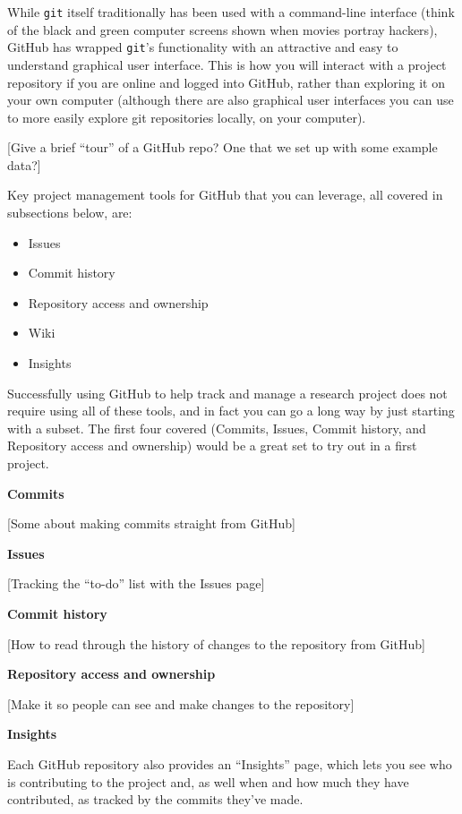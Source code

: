\documentclass[]{tufte-book}
\providecommand{\tightlist}{%
  \setlength{\itemsep}{0pt}\setlength{\parskip}{0pt}}
\begin{document}
While \texttt{git} itself traditionally has been used with a command-line interface
(think of the black and green computer screens shown when movies portray hackers),
GitHub has wrapped \texttt{git}'s functionality with an attractive and easy to
understand graphical user interface. This is how you will interact with a project
repository if you are online and logged into GitHub, rather than exploring it
on your own computer (although there are also graphical user interfaces you can
use to more easily explore git repositories locally, on your computer).

{[}Give a brief ``tour'' of a GitHub repo? One that we set up with some example data?{]}

Key project management tools for GitHub that you can leverage, all covered in
subsections below, are:

\begin{itemize}
\tightlist
\item
  Issues
\item
  Commit history
\item
  Repository access and ownership
\item
  Wiki
\item
  Insights
\end{itemize}

Successfully using GitHub to help track and manage a research project does not
require using all of these tools, and in fact you can go a long way by just starting
with a subset. The first four covered (Commits, Issues, Commit history, and Repository access
and ownership) would be a great set to try out in a first project.

\textbf{Commits}

{[}Some about making commits straight from GitHub{]}

\textbf{Issues}

{[}Tracking the ``to-do'' list with the Issues page{]}

\textbf{Commit history}

{[}How to read through the history of changes to the repository from GitHub{]}

\textbf{Repository access and ownership}

{[}Make it so people can see and make changes to the repository{]}

\textbf{Insights}

Each GitHub repository also provides an ``Insights'' page, which lets you see who is
contributing to the project and, as well when and how much they have contributed, as
tracked by the commits they've made.
\end{document}
